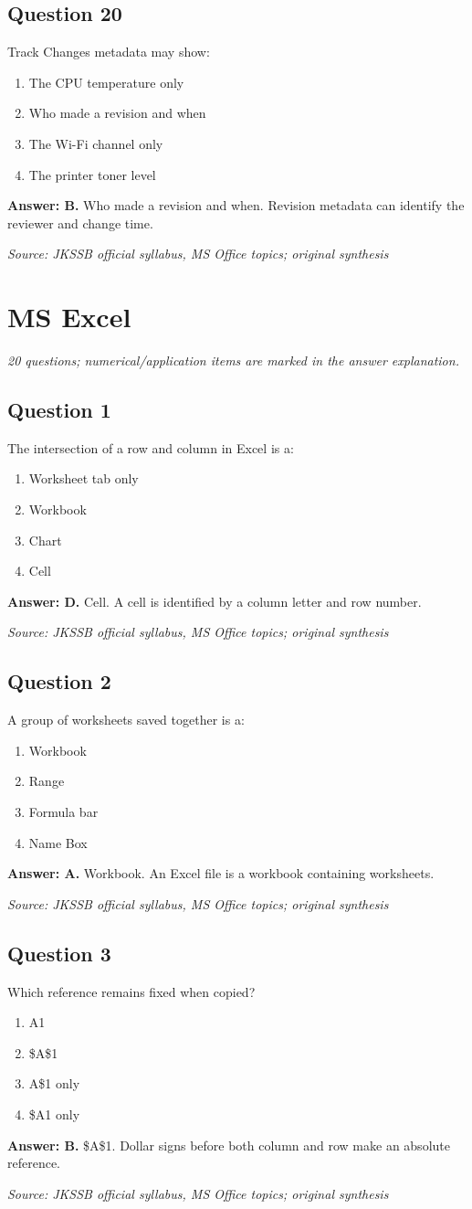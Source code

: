 \documentclass[11pt,a4paper]{book}
\newcommand{\source}[1]{\par\smallskip\textit{Source: #1}}
\newcommand{\answer}[2]{\par\textbf{Answer: #1.} #2}
\begin{document}
\section*{Question 20}
Track Changes metadata may show:
\begin{enumerate}[label=\Alph*.]
\item The CPU temperature only
\item Who made a revision and when
\item The Wi-Fi channel only
\item The printer toner level
\end{enumerate}
\answer{B}{Who made a revision and when. Revision metadata can identify the reviewer and change time.}
\source{JKSSB official syllabus, MS Office topics; original synthesis}

\chapter{MS Excel}
\textit{20 questions; numerical/application items are marked in the answer explanation.}
\section*{Question 1}
The intersection of a row and column in Excel is a:
\begin{enumerate}[label=\Alph*.]
\item Worksheet tab only
\item Workbook
\item Chart
\item Cell
\end{enumerate}
\answer{D}{Cell. A cell is identified by a column letter and row number.}
\source{JKSSB official syllabus, MS Office topics; original synthesis}
\section*{Question 2}
A group of worksheets saved together is a:
\begin{enumerate}[label=\Alph*.]
\item Workbook
\item Range
\item Formula bar
\item Name Box
\end{enumerate}
\answer{A}{Workbook. An Excel file is a workbook containing worksheets.}
\source{JKSSB official syllabus, MS Office topics; original synthesis}
\section*{Question 3}
Which reference remains fixed when copied?
\begin{enumerate}[label=\Alph*.]
\item A1
\item \$A\$1
\item A\$1 only
\item \$A1 only
\end{enumerate}
\answer{B}{\$A\$1. Dollar signs before both column and row make an absolute reference.}
\source{JKSSB official syllabus, MS Office topics; original synthesis}
\end{document}
